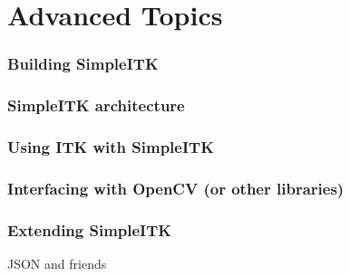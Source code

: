 \section{Advanced Topics}

\begin{frame}
\frametitle{Building SimpleITK}
\end{frame}

\begin{frame}
\frametitle{SimpleITK architecture}
\end{frame}

\begin{frame}
\frametitle{Using ITK with SimpleITK}
\end{frame}

\begin{frame}
\frametitle{Interfacing with OpenCV (or other libraries)}
\end{frame}

\begin{frame}
\frametitle{Extending SimpleITK}
JSON and friends
\end{frame}
